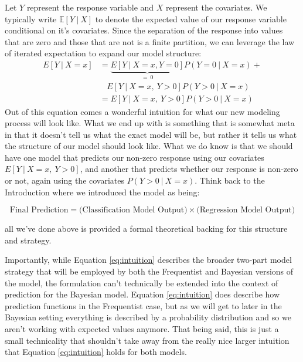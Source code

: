 \documentclass[12pt,twoside]{reedthesis}
\begin{document}
Let \(Y\) represent the response variable and \(X\) represent the covariates. We typically write \(\mathbb{E}[Y \ | \ X]\) to denote the expected value of our response variable conditional on it's covariates. Since the separation of the response into values that are zero and those that are not is a finite partition, we can leverage the law of iterated expectation to expand our model structure:
\begin{equation}
\begin{split}
    E[ Y  \ | \ X = x] &= \underbrace{E[Y \ | \ X = x, Y = 0]}_{= \ 0}P(Y = 0 \ | \ X = x) + \\
    & \ \ \ \ E[Y \ | \ X = x, \ Y > 0]P(Y> 0 \ | \ X = x) \\
    &= E[Y \ | \ X = x, \ Y > 0]P(Y > 0 \ | \ X = x) 
\end{split}
\label{eq:intuition}
\end{equation}
Out of this equation comes a wonderful intuition for what our new modeling process will look like. What we end up with is something that is somewhat meta in that it doesn't tell us what the exact model will be, but rather it tells us what the structure of our model should look like. What we do know is that we should have one model that predicts our non-zero response using our covariates \(E[Y \ | \ X = x, \ Y>0]\), and another that predicts whether our response is non-zero or not, again using the covariates \(P(Y > 0 \ | \ X = x)\). Think back to the Introduction where we introduced the model as being:

\[
\text{Final Prediction} = \bigg(\text{Classification Model Output}\bigg) \times \bigg(\text{Regression Model Output}\bigg) 
\]

all we've done above is provided a formal theoretical backing for this structure and strategy.

Importantly, while Equation \eqref{eq:intuition} describes the broader two-part model strategy that will be employed by both the Frequentist and Bayesian versions of the model, the formulation can't technically be extended into the context of prediction for the Bayesian model. Equation \eqref{eq:intuition} does describe how prediction functions in the Frequentist case, but as we will get to later in the Bayesian setting everything is described by a probability distribution and so we aren't working with expected values anymore. That being said, this is just a small technicality that shouldn't take away from the really nice larger intuition that Equation \eqref{eq:intuition} holds for both models.
\end{document}
